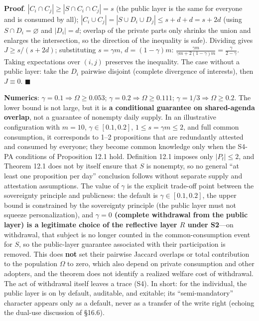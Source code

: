 \documentclass[
  11pt]{article}
\begin{document}
\textbf{Proof}. \(|C_i \cap C_j| \ge |S \cap C_i \cap C_j| = s\) (the
public layer is the same for everyone and is consumed by all);
\(|C_i \cup C_j| = |S \cup D_i \cup D_j| \le s + d + d = s + 2d\) (using
\(S\cap D_i = \varnothing\) and \(|D_i| = d\); overlap of the private
parts only shrinks the union and enlarges the intersection, so the
direction of the inequality is safe). Dividing gives \(J \ge s/(s+2d)\);
substituting \(s = \gamma m\), \(d = (1-\gamma)m\):
\(\frac{\gamma m}{\gamma m + 2(1-\gamma)m} = \frac{\gamma}{2-\gamma}\).
Taking expectations over \((i,j)\) preserves the inequality. The case
without a public layer: take the \(D_i\) pairwise disjoint (complete
divergence of interests), then \(J \equiv 0\). \(\blacksquare\)

\textbf{Numerics}: \(\gamma = 0.1 \Rightarrow \Omega \ge 0.053\);
\(\gamma = 0.2 \Rightarrow \Omega \ge 0.111\);
\(\gamma = 1/3 \Rightarrow \Omega \ge 0.2\). The lower bound is not
large, but it is \textbf{a conditional guarantee on shared-agenda
overlap}, not a guarantee of nonempty daily supply. In an illustrative
configuration with \(m=10\), \(\gamma\in[0.1,0.2]\),
\(1\le s=\gamma m\le2\), and full common consumption, it corresponds to
1--2 propositions that are redundantly attested and consumed by
everyone; they become common knowledge only when the S4-PA conditions of
Proposition 12.1 hold. Definition 12.1 imposes only \(|P_t|\le2\), and
Theorem 12.1 does not by itself ensure that \(S\) is nonempty, so no
general ``at least one proposition per day'' conclusion follows without
separate supply and attestation assumptions. The value of \(\gamma\) is
the explicit trade-off point between the sovereignty principle and
publicness: the default is \(\gamma \in [0.1, 0.2]\), the upper bound is
constrained by the sovereignty principle (the public layer must not
squeeze personalization), and \textbf{\(\gamma = 0\) (complete
withdrawal from the public layer) is a legitimate choice of the
reflective layer \(R\) under S2}---on withdrawal, that subject is no
longer counted in the common-consumption event for \(S\), so the
public-layer guarantee associated with their participation is removed.
This does \textbf{not} set their pairwise Jaccard overlaps or total
contribution to the population \(\Omega\) to zero, which also depend on
private consumption and other adopters, and the theorem does not
identify a realized welfare cost of withdrawal. The act of withdrawal
itself leaves a trace (S4). In short: for the individual, the public
layer is on by default, auditable, and exitable; its ``semi-mandatory''
character appears only as a default, never as a transfer of the write
right (echoing the dual-use discussion of §16.6).
\end{document}
